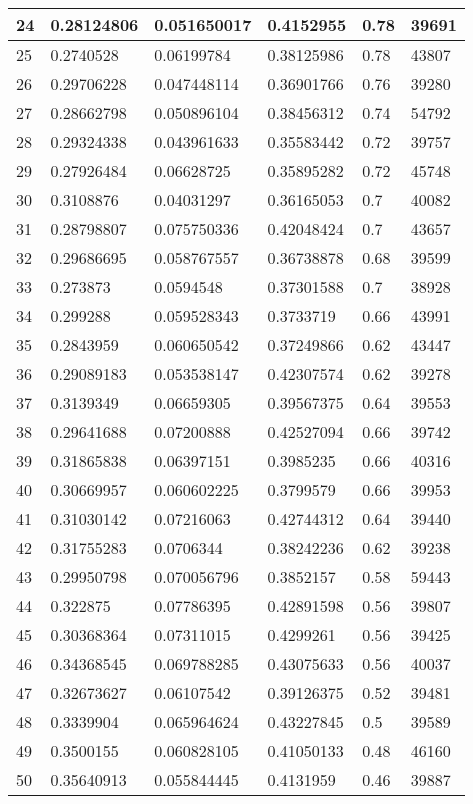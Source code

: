 \begin{longtable}{|l|l|l|l|l|l|}
24 & 0.28124806 & 0.051650017 & 0.4152955 & 0.78 & 39691 \\ \hline 
25 & 0.2740528 & 0.06199784 & 0.38125986 & 0.78 & 43807 \\ \hline 
26 & 0.29706228 & 0.047448114 & 0.36901766 & 0.76 & 39280 \\ \hline 
27 & 0.28662798 & 0.050896104 & 0.38456312 & 0.74 & 54792 \\ \hline 
28 & 0.29324338 & 0.043961633 & 0.35583442 & 0.72 & 39757 \\ \hline 
29 & 0.27926484 & 0.06628725 & 0.35895282 & 0.72 & 45748 \\ \hline 
30 & 0.3108876 & 0.04031297 & 0.36165053 & 0.7 & 40082 \\ \hline 
31 & 0.28798807 & 0.075750336 & 0.42048424 & 0.7 & 43657 \\ \hline 
32 & 0.29686695 & 0.058767557 & 0.36738878 & 0.68 & 39599 \\ \hline 
33 & 0.273873 & 0.0594548 & 0.37301588 & 0.7 & 38928 \\ \hline 
34 & 0.299288 & 0.059528343 & 0.3733719 & 0.66 & 43991 \\ \hline 
35 & 0.2843959 & 0.060650542 & 0.37249866 & 0.62 & 43447 \\ \hline 
36 & 0.29089183 & 0.053538147 & 0.42307574 & 0.62 & 39278 \\ \hline 
37 & 0.3139349 & 0.06659305 & 0.39567375 & 0.64 & 39553 \\ \hline 
38 & 0.29641688 & 0.07200888 & 0.42527094 & 0.66 & 39742 \\ \hline 
39 & 0.31865838 & 0.06397151 & 0.3985235 & 0.66 & 40316 \\ \hline 
40 & 0.30669957 & 0.060602225 & 0.3799579 & 0.66 & 39953 \\ \hline 
41 & 0.31030142 & 0.07216063 & 0.42744312 & 0.64 & 39440 \\ \hline 
42 & 0.31755283 & 0.0706344 & 0.38242236 & 0.62 & 39238 \\ \hline 
43 & 0.29950798 & 0.070056796 & 0.3852157 & 0.58 & 59443 \\ \hline 
44 & 0.322875 & 0.07786395 & 0.42891598 & 0.56 & 39807 \\ \hline 
45 & 0.30368364 & 0.07311015 & 0.4299261 & 0.56 & 39425 \\ \hline 
46 & 0.34368545 & 0.069788285 & 0.43075633 & 0.56 & 40037 \\ \hline 
47 & 0.32673627 & 0.06107542 & 0.39126375 & 0.52 & 39481 \\ \hline 
48 & 0.3339904 & 0.065964624 & 0.43227845 & 0.5 & 39589 \\ \hline 
49 & 0.3500155 & 0.060828105 & 0.41050133 & 0.48 & 46160 \\ \hline 
50 & 0.35640913 & 0.055844445 & 0.4131959 & 0.46 & 39887 \\ \hline 
\end{longtable}